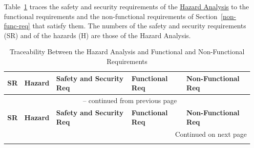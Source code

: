 \documentclass[10pt]{article}
\newcommand{\haurl}{https://team-hindsight.github.io/ophthamology-game/HazardAnalysis/HazardAnalysis.pdf}
\newcommand{\hadoc}[1]{\href{\haurl}{#1}}
\begin{document}
Table~\ref{tab:HA2FRtm} traces the safety and security requirements of the
\hadoc{Hazard Analysis} to the functional requirements and the non-functional
requirements of Section~\ref{non-func-req} that satisfy them. The numbers
of the safety and security requirements (SR) and of the hazards (H) are those
of the Hazard Analysis.

\begin{longtable}{p{} p{} >{\raggedright\arraybackslash}p{} >{\raggedright\arraybackslash}p{} >{\raggedright\arraybackslash}p{}}

\caption{Traceability Between the Hazard Analysis and Functional and Non-Functional Requirements}
\label{tab:HA2FRtm}\\
\toprule
\textbf{SR} & \textbf{Hazard} & \textbf{Safety and Security Req} & \textbf{Functional Req} & \textbf{Non-Functional Req} \\
\midrule
\endfirsthead

\multicolumn{5}{c}{\tablename\ \thetable{} -- continued from previous page} \\
\toprule
\textbf{SR} & \textbf{Hazard} & \textbf{Safety and Security Req} & \textbf{Functional Req} & \textbf{Non-Functional Req} \\
\midrule
\endhead

\midrule
\multicolumn{5}{r}{Continued on next page} \\
\endfoot

\bottomrule
\endlastfoot


\end{longtable}
\end{document}
